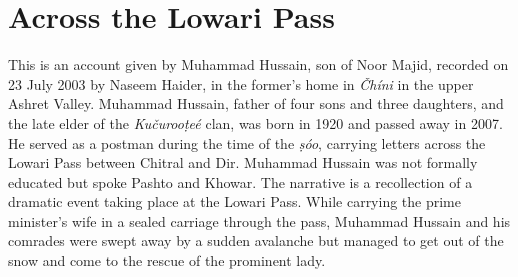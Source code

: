 \appendix
{}

\section*{Across the Lowari Pass}

This is an account given by Muhammad Hussain, son of Noor Majid, recorded on 23 July 2003 by Naseem Haider, in the former’s home in \textit{Čhíni} in the upper Ashret Valley. Muhammad Hussain, father of four sons and three daughters, and the late elder of the \textit{Kučurooṭeé} clan, was born in 1920 and passed away in 2007. He served as a postman during the time of the \textit{ṣóo}, carrying letters across the Lowari Pass between Chitral and Dir. Muhammad Hussain was not formally educated but spoke Pashto and Khowar. The narrative is a recollection of a dramatic event taking place at the Lowari Pass. While carrying the prime minister’s wife in a sealed carriage through the pass, Muhammad Hussain and his comrades were swept away by a sudden avalanche but managed to get out of the snow and come to the rescue of the prominent lady.


